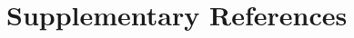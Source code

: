 \documentclass[a4paper, 12pt]{article}
\begin{document}

 





\newpage
\section{Supplementary References}
 


\end{document}
